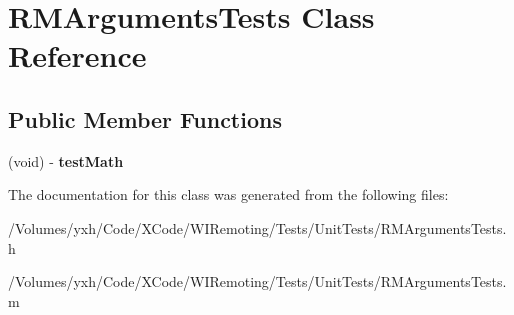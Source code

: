 \hypertarget{interface_r_m_arguments_tests}{
\section{RMArgumentsTests Class Reference}
\label{interface_r_m_arguments_tests}
}
\subsection*{Public Member Functions}
\begin{DoxyCompactItemize}
\item 
\hypertarget{interface_r_m_arguments_tests_aa0ea63f0e680fab46ab52c634c0c0dff}{
(void) -\/ {\bfseries testMath}}
\label{interface_r_m_arguments_tests_aa0ea63f0e680fab46ab52c634c0c0dff}

\end{DoxyCompactItemize}


The documentation for this class was generated from the following files:\begin{DoxyCompactItemize}
\item 
/Volumes/yxh/Code/XCode/WIRemoting/Tests/UnitTests/RMArgumentsTests.h\item 
/Volumes/yxh/Code/XCode/WIRemoting/Tests/UnitTests/RMArgumentsTests.m\end{DoxyCompactItemize}
